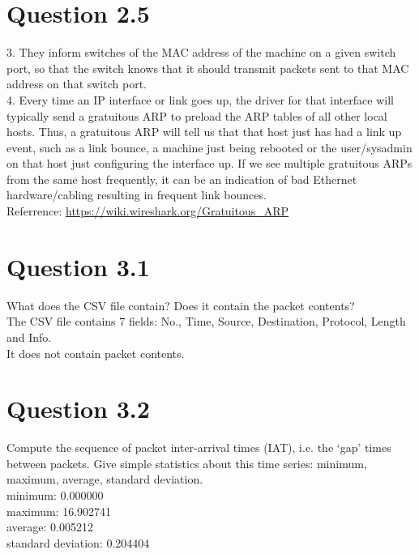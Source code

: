 \documentclass{article}
\newenvironment{homeworkProblem}[1]{
	\section*{#1}
	}{
}
\begin{document}
\begin{homeworkProblem}{Question 2.5}
3. They inform switches of the MAC address of the machine on a given switch port, so that the switch knows that it should transmit packets sent to that MAC address on that switch port.\\

4. Every time an IP interface or link goes up, the driver for that interface will typically send a gratuitous ARP to preload the ARP tables of all other local hosts. Thus, a gratuitous ARP will tell us that that host just has had a link up event, such as a link bounce, a machine just being rebooted or the user/sysadmin on that host just configuring the interface up. If we see multiple gratuitous ARPs from the same host frequently, it can be an indication of bad Ethernet hardware/cabling resulting in frequent link bounces.\\

Referrence: \url{https://wiki.wireshark.org/Gratuitous_ARP}
\end{homeworkProblem}


\begin{homeworkProblem}{Question 3.1}
What does the CSV file contain? Does it contain the packet contents?\\

The CSV file contains 7 fields: No., Time, Source, Destination, Protocol, Length and Info.\\
It does not contain packet contents.
\end{homeworkProblem}


\begin{homeworkProblem}{Question 3.2}
Compute the sequence of packet inter-arrival times (IAT), i.e. the `gap' times between packets. Give simple statistics about this time series: minimum, maximum, average, standard deviation.\\

minimum: 0.000000\\
maximum: 16.902741\\
average: 0.005212\\
standard deviation: 0.204404
\end{homeworkProblem}
\end{document}
